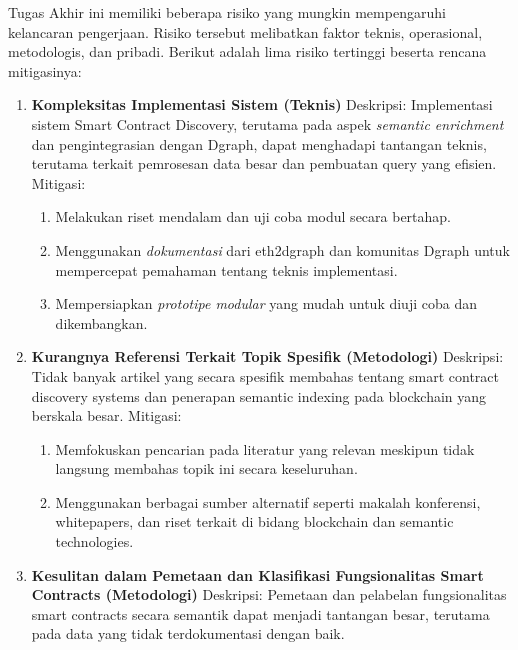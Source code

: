 Tugas Akhir ini memiliki beberapa risiko yang mungkin mempengaruhi kelancaran pengerjaan. Risiko tersebut melibatkan faktor teknis, operasional, metodologis, dan pribadi. Berikut adalah lima risiko tertinggi beserta rencana mitigasinya:

\begin{enumerate}
  \item \textbf{Kompleksitas Implementasi Sistem (Teknis)} \newline 
  Deskripsi: Implementasi sistem Smart Contract Discovery, terutama pada aspek \textit{semantic enrichment} dan pengintegrasian dengan Dgraph, dapat menghadapi tantangan teknis, terutama terkait pemrosesan data besar dan pembuatan query yang efisien. \newline
  Mitigasi:
  \begin{enumerate}
    \item Melakukan riset mendalam dan uji coba modul secara bertahap.  
    \item Menggunakan \textit{dokumentasi} dari eth2dgraph dan komunitas Dgraph untuk mempercepat pemahaman tentang teknis implementasi. 
    \item Mempersiapkan \textit{prototipe modular} yang mudah untuk diuji coba dan dikembangkan.
  \end{enumerate}
  \item \textbf{Kurangnya Referensi Terkait Topik Spesifik (Metodologi)} \newline 
  Deskripsi: Tidak banyak artikel yang secara spesifik membahas tentang smart contract discovery systems dan penerapan semantic indexing pada blockchain yang berskala besar.  \newline
  Mitigasi:  
  \begin{enumerate}
    \item Memfokuskan pencarian pada literatur yang relevan meskipun tidak langsung membahas topik ini secara keseluruhan.
    \item Menggunakan berbagai sumber alternatif seperti makalah konferensi, whitepapers, dan riset terkait di bidang blockchain dan semantic technologies.  
  \end{enumerate}
  \item \textbf{Kesulitan dalam Pemetaan dan Klasifikasi Fungsionalitas Smart Contracts (Metodologi)}  \newline
  Deskripsi: Pemetaan dan pelabelan fungsionalitas smart contracts secara semantik dapat menjadi tantangan besar, terutama pada data yang tidak terdokumentasi dengan baik. \newline  

\end{enumerate}

